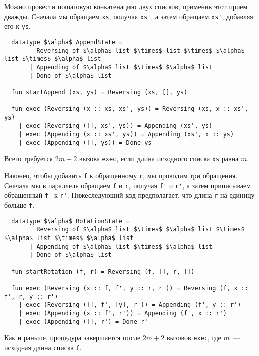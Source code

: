 Можно провести пошаговую конкатенацию двух списков, применив этот
прием дважды. Сначала мы обращаем \lstinline!xs!, получая
\lstinline!xs'!, а затем обращаем \lstinline!xs'!, добавляя его к
\lstinline!ys!.
\begin{lstlisting}
  datatype $\alpha$ AppendState =
         Reversing of $\alpha$ list $\times$ list $\times$ $\alpha$ list $\times$ $\alpha$ list
       | Appending of $\alpha$ list $\times$ $\alpha$ list
       | Done of $\alpha$ list

  fun startAppend (xs, ys) = Reversing (xs, [], ys)

  fun exec (Reversing (x :: xs, xs', ys)) = Reversing (xs, x :: xs', ys)
    | exec (Reversing ([], xs', ys)) = Appending (xs', ys)
    | exec (Appending (x :: xs', ys)) = Appending (xs', x :: ys)
    | exec (Appending ([], ys)) = Done ys
\end{lstlisting}
Всего требуется $2m + 2$ вызова \lstinline!exec!, если длина исходного
списка \lstinline!xs! равна $m$.

Наконец, чтобы добавить \lstinline!f! к обращенному \lstinline!r!, мы
проводим три обращения. Сначала мы в параллель обращаем \lstinline!f!
и \lstinline!r!, получая \lstinline!f'! и \lstinline!r'!, а затем
приписываем обращенный \lstinline!f'! к \lstinline!r'!. Нижеследующий
код предполагает, что длина \lstinline!r! на единицу больше
\lstinline!f!.
\begin{lstlisting}
  datatype $\alpha$ RotationState =
         Reversing of $\alpha$ list $\times$ $\alpha$ list $\times$ $\alpha$ list $\times$ $\alpha$ list
       | Appending of $\alpha$ list $\times$ $\alpha$ list
       | Done of $\alpha$ list

  fun startRotation (f, r) = Reversing (f, [], r, [])

  fun exec (Reversing (x :: f, f', y :: r, r')) = Reversing (f, x :: f', r, y :: r')
    | exec (Reversing ([], f', [y], r')) = Appending (f', y :: r')
    | exec (Appending (x :: f', r')) = Appending (f', x :: r')
    | exec (Appending ([], r') = Done r'
\end{lstlisting}
Как и раньше, процедура завершается после $2m + 2$ вызовов
\lstinline!exec!, где $m$~--- исходная длина списка \lstinline!f!.

